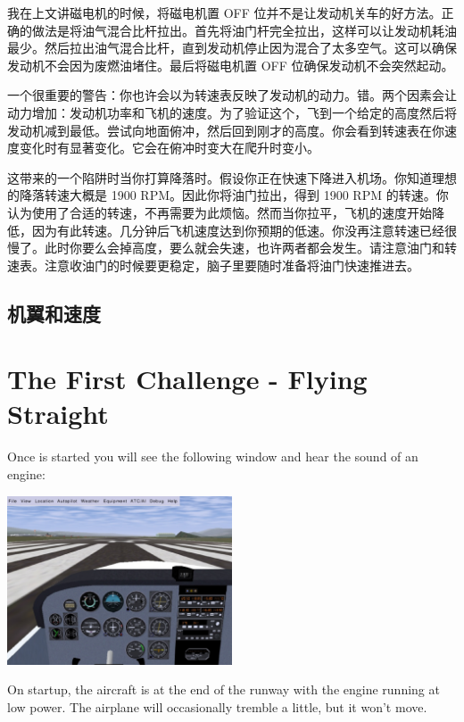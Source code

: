 我在上文讲磁电机的时候，将磁电机置 OFF 位并不是让发动机关车的好方法。正确的做法是将油气混合比杆拉出。首先将油门杆完全拉出，这样可以让发动机耗油最少。然后拉出油气混合比杆，直到发动机停止因为混合了太多空气。这可以确保发动机不会因为废燃油堵住。最后将磁电机置 OFF 位确保发动机不会突然起动。

一个很重要的警告：你也许会以为转速表反映了发动机的动力。错。两个因素会让动力增加：发动机功率和飞机的速度。为了验证这个，飞到一个给定的高度然后将发动机减到最低。尝试向地面俯冲，然后回到刚才的高度。你会看到转速表在你速度变化时有显著变化。它会在俯冲时变大在爬升时变小。

这带来的一个陷阱时当你打算降落时。假设你正在快速下降进入机场。你知道理想的降落转速大概是 1900 RPM。因此你将油门拉出，得到 1900 RPM 的转速。你认为使用了合适的转速，不再需要为此烦恼。然而当你拉平，飞机的速度开始降低，因为有此转速。几分钟后飞机速度达到你预期的低速。你没再注意转速已经很慢了。此时你要么会掉高度，要么就会失速，也许两者都会发生。请注意油门和转速表。注意收油门的时候要更稳定，脑子里要随时准备将油门快速推进去。

\subsection{机翼和速度}
\label{sec:WingsAndForce}


\iffalse
\section{The First Challenge - Flying Straight}
\label{sec:FlyingStraight}

Once \FlightGear{} is started you will see the following window and hear the
sound of an engine:

\begin{center}
\includegraphics[width=0.5\textwidth]{img/tut_6}
\end{center}

On startup, the aircraft is at the end of the runway with the engine running
at low power. The airplane will occasionally tremble a little, but it won't
move.

